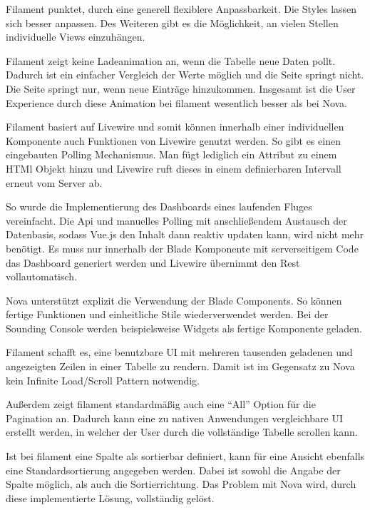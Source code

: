 \newpage

Filament punktet, durch eine generell flexiblere Anpassbarkeit.
Die Styles lassen sich besser anpassen.
Des Weiteren gibt es die Möglichkeit, an vielen Stellen individuelle Views einzuhängen.

Filament zeigt keine Ladeanimation an, wenn die Tabelle neue Daten pollt.
Dadurch ist ein einfacher Vergleich der Werte möglich und die Seite springt nicht.
Die Seite springt nur, wenn neue Einträge hinzukommen.
Insgesamt ist die User Experience durch diese Animation bei filament wesentlich besser als bei Nova.

Filament basiert auf Livewire\cite{livewire} und somit können innerhalb einer individuellen Komponente auch Funktionen von Livewire genutzt werden.
So gibt es einen eingebauten Polling Mechanismus.
Man fügt lediglich ein Attribut zu einem HTMl Objekt hinzu und Livewire ruft dieses in einem definierbaren Intervall erneut vom Server ab.

So wurde die Implementierung des Dashboards eines laufenden Fluges vereinfacht.
Die Api und manuelles Polling mit anschließendem Austausch der Datenbasis, sodass Vue.js den Inhalt dann reaktiv updaten kann, wird nicht mehr benötigt.
Es muss nur innerhalb der Blade Komponente mit serverseitigem Code das Dashboard generiert werden und Livewire übernimmt den Rest vollautomatisch.

\newpage

Nova unterstützt explizit die Verwendung der Blade Components.
So können fertige Funktionen und einheitliche Stile wiederverwendet werden.
Bei der Sounding Console werden beispielsweise Widgets als fertige Komponente geladen.

Filament schafft es, eine benutzbare UI mit mehreren tausenden geladenen und angezeigten Zeilen in einer Tabelle zu rendern.
Damit ist im Gegensatz zu Nova kein Infinite Load/Scroll Pattern notwendig.

Außerdem zeigt filament standardmäßig auch eine \enquote{All} Option für die Pagination an.
Dadurch kann eine zu nativen Anwendungen vergleichbare UI erstellt werden, in welcher der User durch die vollständige Tabelle scrollen kann.

Ist bei filament eine Spalte als sortierbar definiert, kann für eine Ansicht ebenfalls eine Standardsortierung angegeben werden.
Dabei ist sowohl die Angabe der Spalte möglich, als auch die Sortierrichtung.
Das Problem mit Nova wird, durch diese implementierte Lösung, vollständig gelöst.

